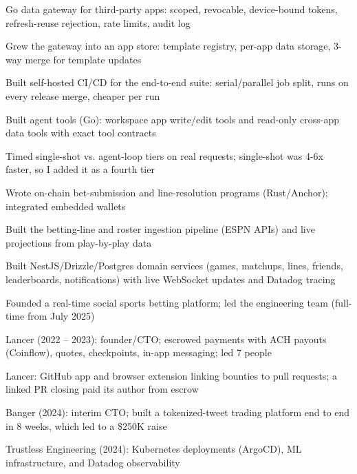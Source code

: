 \documentclass[print]{jack-resume}
\begin{document}
\begin{tightemize}
    \item Go data gateway for third-party apps: scoped, revocable, device-bound tokens, refresh-reuse rejection, rate limits, audit log
    \item Grew the gateway into an app store: template registry, per-app data storage, 3-way merge for template updates
    \item Built self-hosted CI/CD for the end-to-end suite: serial/parallel job split, runs on every release merge, cheaper per run
    \item Built agent tools (Go): workspace app write/edit tools and read-only cross-app data tools with exact tool contracts
    \item Timed single-shot vs. agent-loop tiers on real requests; single-shot was 4-6x faster, so I added it as a fourth tier
\end{tightemize}
\sectionsep

\begin{tightemize}
    \item Wrote on-chain bet-submission and line-resolution programs (Rust/Anchor); integrated embedded wallets
    \item Built the betting-line and roster ingestion pipeline (ESPN APIs) and live projections from play-by-play data
    \item Built NestJS/Drizzle/Postgres domain services (games, matchups, lines, friends, leaderboards, notifications) with live WebSocket updates and Datadog tracing
    \item Founded a real-time social sports betting platform; led the engineering team (full-time from July 2025)
\end{tightemize}
\sectionsep

\begin{tightemize}
    \item Lancer (2022 -- 2023): founder/CTO; escrowed payments with ACH payouts (Coinflow), quotes, checkpoints, in-app messaging; led 7 people
    \item Lancer: GitHub app and browser extension linking bounties to pull requests; a linked PR closing paid its author from escrow
    \item Banger (2024): interim CTO; built a tokenized-tweet trading platform end to end in 8 weeks, which led to a \$250K raise
    \item Trustless Engineering (2024): Kubernetes deployments (ArgoCD), ML infrastructure, and Datadog observability
\end{tightemize}
\sectionsep
\end{document}
